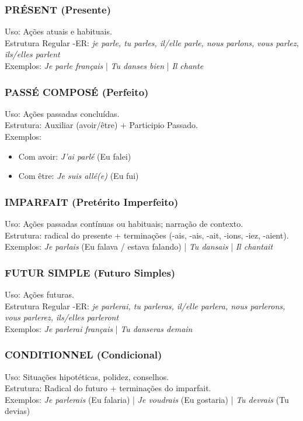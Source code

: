 \documentclass[a4paper,12pt]{article}
\begin{document}
\subsubsection{PRÉSENT (Presente)}
Uso: Ações atuais e habituais. \\
Estrutura Regular -ER: \emph{je parle, tu parles, il/elle parle, nous parlons, vous parlez, ils/elles parlent} \\
Exemplos: \emph{Je parle français} | \emph{Tu danses bien} | \emph{Il chante}

\subsubsection{PASSÉ COMPOSÉ (Perfeito)}
Uso: Ações passadas concluídas. \\
Estrutura: Auxiliar (avoir/être) + Participio Passado. \\
Exemplos:
\begin{itemize}
    \item Com avoir: \emph{J’ai parlé} (Eu falei)
    \item Com être: \emph{Je suis allé(e)} (Eu fui)
\end{itemize}

\subsubsection{IMPARFAIT (Pretérito Imperfeito)}
Uso: Ações passadas contínuas ou habituais; narração de contexto. \\
Estrutura: radical do presente + terminações (-ais, -ais, -ait, -ions, -iez, -aient). \\
Exemplos: \emph{Je parlais} (Eu falava / estava falando) | \emph{Tu dansais} | \emph{Il chantait}

\subsubsection{FUTUR SIMPLE (Futuro Simples)}
Uso: Ações futuras. \\
Estrutura Regular -ER: \emph{je parlerai, tu parleras, il/elle parlera, nous parlerons, vous parlerez, ils/elles parleront} \\
Exemplos: \emph{Je parlerai français} | \emph{Tu danseras demain}

\subsubsection{CONDITIONNEL (Condicional)}
Uso: Situações hipotéticas, polidez, conselhos. \\
Estrutura: Radical do futuro + terminações do imparfait. \\
Exemplos: \emph{Je parlerais} (Eu falaria) | \emph{Je voudrais} (Eu gostaria) | \emph{Tu devrais} (Tu devias)
\end{document}
